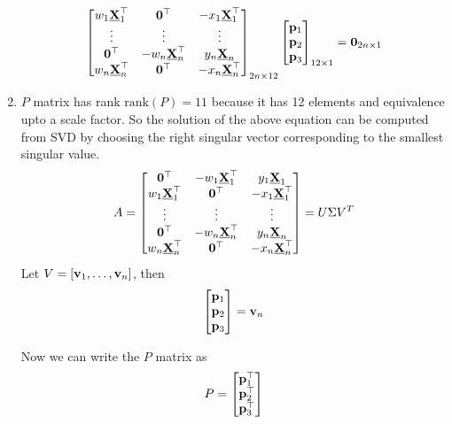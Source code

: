 \documentclass{article}
\begin{document}
\begin{enumerate}
\[\begin{bmatrix}
           w_1 \underline{\mathbf{X}}_1^\top & \mathbf{0}^\top  & -x_1 \underline{\mathbf{X}}_1^\top \\
           \vdots & \vdots & \vdots\\
           \mathbf{0}^\top & -w_n \underline{\mathbf{X}}_n^\top & y_n \underline{\mathbf{X}}_n \\
           w_n \underline{\mathbf{X}}_n^\top & \mathbf{0}^\top  & -x_n \underline{\mathbf{X}}_n^\top \\
         \end{bmatrix}_{2n \times 12}
         \begin{bmatrix}
           \mathbf{p}_1 \\
           \mathbf{p}_2 \\
           \mathbf{p}_3
         \end{bmatrix}_{12 \times 1}
         = \mathbf{0}_{2n \times 1}
       \]
   \item $P$ matrix has rank $\text{rank}(P) = 11$ because it has 12 elements
     and equivalence upto a scale factor. So the solution of the above equation
     can be computed from SVD by choosing the right singular vector corresponding
     to the smallest singular value.
     \[
      A = \begin{bmatrix}
        \mathbf{0}^\top & -w_1 \underline{\mathbf{X}}_1^\top & y_1 \underline{\mathbf{X}}_1 \\
        w_1 \underline{\mathbf{X}}_1^\top & \mathbf{0}^\top  & -x_1 \underline{\mathbf{X}}_1^\top \\
        \vdots & \vdots & \vdots\\
        \mathbf{0}^\top & -w_n \underline{\mathbf{X}}_n^\top & y_n \underline{\mathbf{X}}_n \\
        w_n \underline{\mathbf{X}}_n^\top & \mathbf{0}^\top  & -x_n \underline{\mathbf{X}}_n^\top \\
       \end{bmatrix} = U\Sigma V^T
     \]
     Let $V = [\mathbf{v}_1, \dots, \mathbf{v}_n]$, then
     \[
       \begin{bmatrix}
         \mathbf{p}_1 \\
         \mathbf{p}_2 \\
         \mathbf{p}_3
         \end{bmatrix} = \mathbf{v}_n
       \]

       Now we can write the $P$ matrix as
       \[
         P = \begin{bmatrix}
           \mathbf{p}_1^\top \\
           \mathbf{p}_2^\top \\
           \mathbf{p}_3^\top
         \end{bmatrix}
         \]
\end{enumerate}
\newpage
\end{document}
